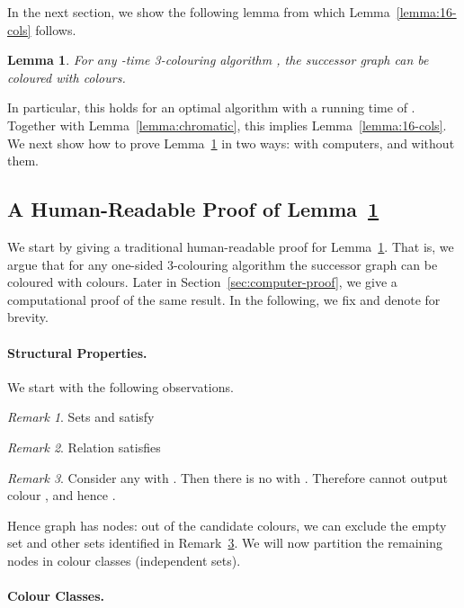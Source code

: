 \documentclass[a4paper,11pt]{article}
\newtheorem{lemma}[theorem]{Lemma}
\theoremstyle{remark}
\newtheorem{remark}{Remark}
\begin{document}
In the next section, we show the following lemma from which Lemma~\ref{lemma:16-cols} follows.

\begin{lemma} \label{lemma:s2-16-cols}
 For any -time 3-colouring algorithm , the successor graph  can be coloured with  colours.
\end{lemma}
In particular, this holds for an optimal algorithm  with a running time of . Together with Lemma~\ref{lemma:chromatic}, this implies Lemma~\ref{lemma:16-cols}. We next show how to prove Lemma~\ref{lemma:s2-16-cols} in two ways: with computers, and without them.

\subsection{A Human-Readable Proof of Lemma~\ref{lemma:s2-16-cols}}

We start by giving a traditional human-readable proof for Lemma~\ref{lemma:s2-16-cols}. That is, we argue that for any one-sided 3-colouring algorithm  the successor graph  can be coloured with  colours. Later in Section~\ref{sec:computer-proof}, we give a computational proof of the same result. In the following, we fix  and denote  for brevity. 

\paragraph{Structural Properties.} 

We start with the following observations.
\begin{remark}\label{remark:colors}
Sets  and  satisfy

\end{remark}

\begin{remark}\label{remark:successors}
Relation  satisfies

\end{remark}

\begin{remark}\label{remark:nodes}
Consider any  with . Then there is no  with . Therefore  cannot output colour , and hence .
\end{remark}

Hence graph  has  nodes: out of the  candidate colours, we can exclude the empty set and  other sets identified in Remark~\ref{remark:nodes}. We will now partition the remaining nodes in  colour classes (independent sets).

\paragraph{Colour Classes.} 
\end{document}

